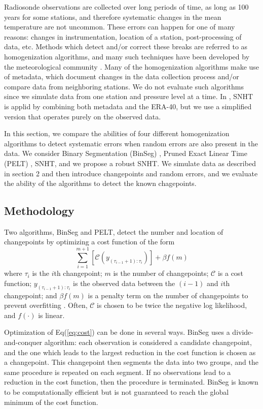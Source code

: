 \documentclass[12pt]{article}
\begin{document}
\begin{doublespacing}
Radiosonde observations are collected over long periods of time, as long as 100 years for some stations, and therefore systematic changes in the mean temperature are not uncommon.  These errors can happen for one of many reasons: changes in instrumentation, location of a station, post-processing of data, etc.  Methods which detect and/or correct these breaks are referred to as homogenization algorithms, and many such techniques have been developed by the meteorological community \cite{alexandersson86, domonkos13, gruber08, haimberger07, lanzante03, li14, lu10, venema12}.  Many of the homogenization algorithms make use of metadata, which document changes in the data collection process and/or compare data from neighboring stations.  We do not evaluate such algorithms since we simulate data from one station and pressure level at a time.  In \cite{haimberger07}, SNHT is applid by combining both metadata and the ERA-40, but we use a simplified version that operates purely on the observed data.

In this section, we compare the abilities of four different homogenization algorithms to detect systematic errors when random errors are also present in the data.  We consider Binary Segmentation (BinSeg) \cite{scott74}, Pruned Exact Linear Time (PELT) \cite{killick12}, SNHT, and we propose a robust SNHT.  We simulate data as described in section 2 and then introduce changepoints and random errors, and we evaluate the ability of the algorithms to detect the known chagepoints. 

\subsection{Methodology}

Two algorithms, BinSeg and PELT, detect the number and location of changepoints by optimizing a cost function of the form
\begin{equation}
	\sum_{i=1}^{m+1} [\mathcal{C}(y_{(\tau_{i-1}+1):\tau_i})] + \beta f(m)
	\label{eq:cost}
\end{equation}
where $\tau_i$ is the $i$th changepoint; $m$ is the number of changepoints; $\mathcal{C}$ is a cost function; $y_{(\tau_{i-1}+1):\tau_i}$ is the observed data between the $(i-1)$ and $i$th changepoint; and $\beta f(m)$ is a penalty term on the number of changepoints to prevent overfitting \cite{killick12}.  Often, $\mathcal{C}$ is chosen to be twice the negative log likelihood, and $f(\cdot)$ is linear.

Optimization of Eq(\ref{eq:cost}) can be done in several ways.  BinSeg uses a divide-and-conquer algorithm: each observation is considered a candidate changepoint, and the one which leads to the largest reduction in the cost function is chosen as a changepoint.  This changepoint then segments the data into two groups, and the same procedure is repeated on each segment.  If no observations lead to a reduction in the cost function, then the procedure is terminated.  BinSeg is known to be computationally efficient but is not guaranteed to reach the global minimum of the cost function.


\end{doublespacing}
\end{document}
